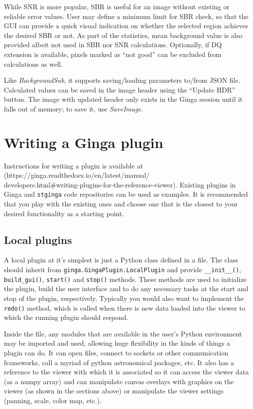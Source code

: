 \documentclass[11pt,twoside]{article}
\begin{document}

While SNR is more popular, SBR is useful for an image without existing or
reliable error values. User may define a minimum limit for SBR check,
so that the GUI can provide a quick visual indication on whether the
selected region achieves the desired SBR or not.
As part of the statistics, mean background value is also
provided albeit not used in SBR nor SNR calculations.
Optionally, if DQ extension is available, pixels marked as
``not good'' can be excluded from calculations as well.

Like {\em BackgroundSub}, it supports saving/loading parameters to/from
JSON file.
Calculated values can be saved in the image header using the ``Update HDR''
button.
The image with updated header only exists in the Ginga session until it
falls out of memory; to save it, use {\em SaveImage}.

\section{Writing a Ginga plugin}

Instructions for writing a plugin is available at
(https://ginga.readthedocs.io/en/latest/manual/\\
developers.html\#writing-plugins-for-the-reference-viewer).
Existing plugins in Ginga and {\tt stginga} code repositories can be used as
examples. It is recommended that you play with the existing ones and
choose one that is the closest to your desired functionality as a
starting point.

\subsection{Local plugins}
A local plugin at it's simplest is just a Python class defined in a file.
The class should inherit from {\tt ginga.GingaPlugin.LocalPlugin}
and provide {\tt \_\_init\_\_()}, {\tt build\_gui()}, {\tt start()}
and {\tt stop()} methods.  These methods are used to initialize the
plugin, build the user interface and to do any necessary tasks at the
start and stop of the plugin, respectively. Typically you would also
want to implement the {\tt redo()} method, which is called when there is
new data loaded into the viewer to which the running plugin should respond.

Inside the file, any modules that are available in the user's Python
environment may be imported and used, allowing huge flexibility in
the kinds of things a plugin can do.  It can open files, connect to
sockets or other communication frameworks, call a myriad of python
astronomical packages, etc.  It also has a reference to the viewer with
which it is associated so it can access the viewer data (as a numpy array)
and can manipulate canvas overlays with graphics on the viewer (as shown
in the sections above) or manipulate the viewer settings (panning,
scale, color map, etc.).
\end{document}
